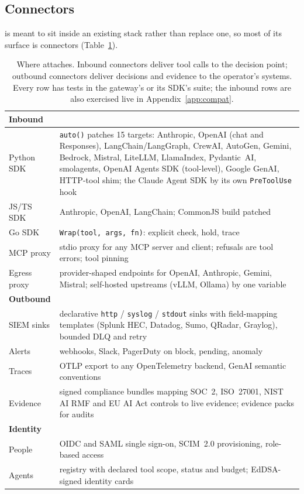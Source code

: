 \subsection{Connectors}
\label{sec:connectors}

\system is meant to sit inside an existing stack rather than replace
one, so most of its surface is connectors (Table~\ref{tab:connectors}).

\begin{table}[t]
\centering\small
\setlength{\tabcolsep}{4pt}
\caption{Where \system attaches. Inbound connectors deliver tool calls to the
decision point; outbound connectors deliver decisions and evidence to the
operator's systems. Every row has tests in the gateway's or its SDK's suite; the inbound rows are also exercised live in Appendix~\ref{app:compat}.}
\label{tab:connectors}
\begin{tabular}{lp{}}
\toprule
\textbf{Inbound} & \\
\midrule
Python SDK & \texttt{auto()} patches 15 targets: Anthropic, OpenAI (chat and Responses), LangChain/LangGraph, CrewAI, AutoGen, Gemini, Bedrock, Mistral, LiteLLM, LlamaIndex, Pydantic~AI, smolagents, OpenAI Agents SDK (tool-level), Google GenAI, HTTP-tool shim; the Claude Agent SDK by its own \texttt{PreToolUse} hook \\
JS/TS SDK & Anthropic, OpenAI, LangChain; CommonJS build patched \\
Go SDK & \texttt{Wrap(tool, args, fn)}: explicit check, hold, trace \\
MCP proxy & stdio proxy for any MCP server and client; refusals are tool errors; tool pinning \\
Egress proxy & provider-shaped endpoints for OpenAI, Anthropic, Gemini, Mistral; self-hosted upstreams (vLLM, Ollama) by one variable \\
\midrule
\textbf{Outbound} & \\
\midrule
SIEM sinks & declarative \texttt{http} / \texttt{syslog} / \texttt{stdout} sinks with field-mapping templates (Splunk HEC, Datadog, Sumo, QRadar, Graylog), bounded DLQ and retry \\
Alerts & webhooks, Slack, PagerDuty on block, pending, anomaly \\
Traces & OTLP export to any OpenTelemetry backend, GenAI semantic conventions \\
Evidence & signed compliance bundles mapping SOC~2, ISO~27001, NIST AI RMF and EU AI Act controls to live evidence; evidence packs for audits \\
\midrule
\textbf{Identity} & \\
\midrule
People & OIDC and SAML single sign-on, SCIM~2.0 provisioning, role-based access \\
Agents & registry with declared tool scope, status and budget; EdDSA-signed identity cards \\
\bottomrule
\end{tabular}
\end{table}


